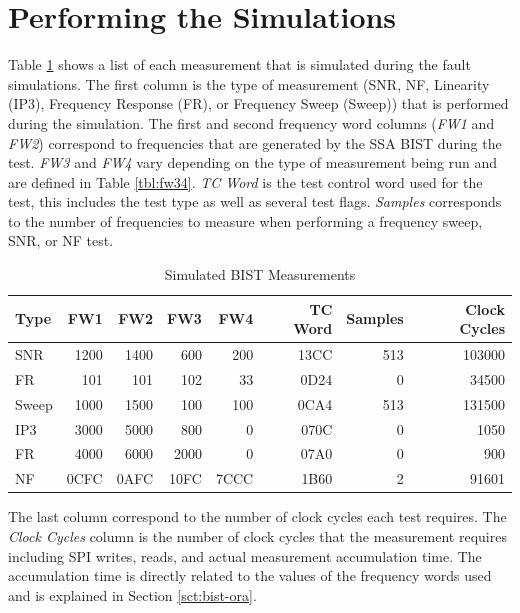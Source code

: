 \documentclass[12pt]{report}
\begin{document}
\section{Performing the Simulations}
Table \ref{tbl:faulttests} shows a list of each measurement that is simulated during the fault simulations.  The first column is the type of measurement (SNR, NF, Linearity (IP3), Frequency Response (FR), or Frequency Sweep (Sweep)) that is performed during the simulation.  The first and second frequency word columns (\textit{FW1} and \textit{FW2}) correspond to frequencies that are generated by the SSA BIST during the test.  \textit{FW3} and \textit{FW4} vary depending on the type of measurement being run and are defined in Table \ref{tbl:fw34}.  \textit{TC Word} is the test control word used for the test, this includes the test type as well as several test flags.  \textit{Samples} corresponds to the number of frequencies to measure when performing a frequency sweep, SNR, or NF test.
\begin{table}
  \begin{center}
    \caption{Simulated BIST Measurements}
    \begin{tabular}{|l|r|r|r|r|r|r|r|}
      \hline
        Type & FW1 & FW2 & FW3 & FW4 & TC Word & Samples & Clock Cycles \\ \hline
        SNR & 1200 & 1400 & 600 & 200 & 13CC & 513 & 103000 \\ \hline
        FR & 101 & 101 & 102 & 33 & 0D24 & 0 & 34500 \\ \hline
        Sweep & 1000 & 1500 & 100 & 100 & 0CA4 & 513 & 131500\\ \hline
        IP3 & 3000 & 5000 & 800 & 0 & 070C & 0 & 1050 \\ \hline
        FR & 4000 & 6000 & 2000 & 0 & 07A0 & 0 & 900 \\ \hline
        NF & 0CFC & 0AFC & 10FC & 7CCC & 1B60 & 2 & 91601 \\
      \hline
    \end{tabular}
    \label{tbl:faulttests}
  \end{center}
\end{table}
The last column correspond to the number of clock cycles each test requires.  The \textit{Clock Cycles} column is the number of clock cycles that the measurement requires including SPI writes, reads, and actual measurement accumulation time.  The accumulation time is directly related to the values of the frequency words used and is explained in Section \ref{sct:bist-ora}.
\end{document}
